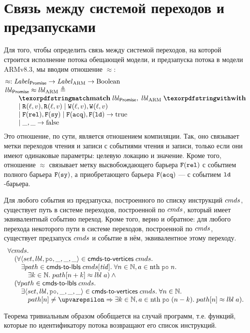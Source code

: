 \section{Связь между системой переходов и предзапусками}
\label{sec:lts-rel}
Для того, чтобы определить связь между системой переходов, на которой строится исполнение
потока обещающей модели, и предзапуска потока в модели ARMv8.3, мы вводим отношение $\approx$:
\[\inarr{
  \approx : \Label_{\Promise} \rightarrow \Label_{\ARM} \rightarrow {\rm Boolean} \\
  lbl_{\Promise} \approx lbl_{\ARM} \defeq \\
  \qquad \kw{match} \; lbl_{\Promise}, \; lbl_{\ARM} \; \kw{with} \\
  \qquad
    \begin{array}{@{}l}
      \mid \rlab{}{\loc}{\val}, \rlab{}{\loc}{\val}
      \mid \wlab{}{\loc}{\val}, \wlab{}{\loc}{\val} \\
      \mid \flab{\rel}, \flab{\SY}
      \mid \flab{\acq}, \flab{\LD} \rightarrow {\rm true} \\
      \mid \_, \_ \rightarrow {\rm false}
    \end{array}
}\]
Это отношение, по сути, является отношением компиляции. Так, оно связывает метки переходов
чтения и записи с событиями чтения и записи, только если они имеют одинаковые параметры: целевую локацию
и значение. Кроме того, отношение $\approx$ связывает метку высвобождающего барьера ${{\mathtt{F}}}({\mathtt{rel}})$
с событием полного барьера ${{\mathtt{F}}}(\mathtt{sy})$, а приобретающего барьера ${{\mathtt{F}}}({\mathtt{acq}})$ --- с событием $\mathtt{ld}$-барьера.

\begin{theorem}
  \label{thm:compl-state-preexec}
  Для любого события из предзапуска, построенного по списку инструкций ${cmds}$, существует путь
  в системе переходов, построенной по ${cmds}$, который имеет эквивалентный событию переход.
  Кроме того, верно и обратное: для любого перехода некоторого пути в системе переходов, построенной по ${cmds}$,
  существует предзапуск ${cmds}$ и событие в нём, эквивалентное этому переходу.
\[\inarr{
\forall \Carm. \\
\quad (\forall \tup{set, lbl, \lPO, \_, \_, \_} \in \cmdsToVrtxs \; \Carm. \\
\qquad \exists path \in \cmdsToLbls \; \Carm[\tId]. \; \forall n \in \mathbb{N}, a \in \nthf \; \lPO \; n. \\
\qquad \quad \exists k \in \mathbb{N}. \; path[n + k] \approx lbl \; a) \land {} \\
\quad (\forall path \in \cmdsToLbls \; \Carm. \\
\qquad \exists \tup{set, lbl, \lPO, \_, \_, \_} \in \cmdsToVrtxs \; \Carm. \;
  \forall n \in \mathbb{N}. \\
\qquad \quad path[n] \neq \epsilon \Rightarrow \exists k \in \mathbb{N}, a \in \nthf \; \lPO \; (n - k). \; path[n] \approx lbl \; a).
}\]
\end{theorem}
Теорема тривиальным образом обобщается на случай программ, т.е. функций, которые по идентификатору потока возвращают
его список инструкций.

